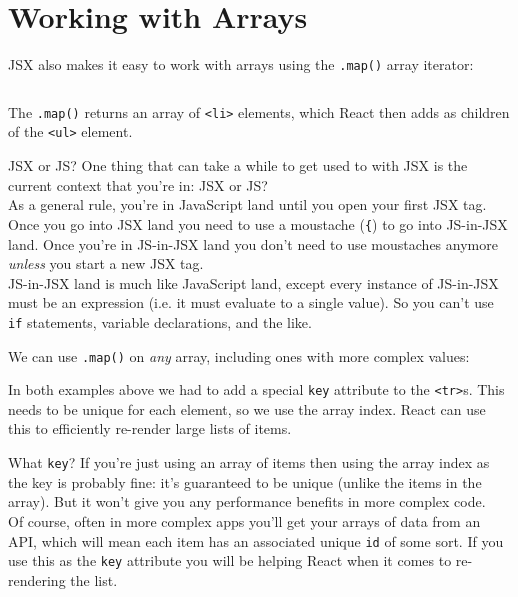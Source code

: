 \section{Working with Arrays}


JSX also makes it easy to work with arrays using the \texttt{.map()} array iterator:

\inputminted{jsx}{01/figures/02/13-map.jsx}

The \texttt{.map()} returns an array of \texttt{<li>} elements, which React then adds as children of the \texttt{<ul>} element.

\begin{infobox}{JSX or JS?}
    One thing that can take a while to get used to with JSX is the current context that you're in: JSX or JS?
    \\

    As a general rule, you're in JavaScript land until you open your first JSX tag. Once you go into JSX land you need to use a moustache (\texttt{\{}) to go into JS-in-JSX land. Once you're in JS-in-JSX land you don't need to use moustaches anymore \textit{unless} you start a new JSX tag.
    \\

    JS-in-JSX land is much like JavaScript land, except every instance of JS-in-JSX must be an expression (i.e. it must evaluate to a single value). So you can't use \texttt{if} statements, variable declarations, and the like.

\end{infobox}


\pagebreak


We can use \texttt{.map()} on \textit{any} array, including ones with more complex values:


In both examples above we had to add a special \texttt{key} attribute to the \texttt{<tr>}s. This needs to be unique for each element, so we use the array index. React can use this to efficiently re-render large lists of items.

\begin{infobox}{What \texttt{key}?}
    If you're just using an array of items then using the array index as the key is probably fine: it's guaranteed to be unique (unlike the items in the array). But it won't give you any performance benefits in more complex code.
    \\

    Of course, often in more complex apps you'll get your arrays of data from an API, which will mean each item has an associated unique \texttt{id} of some sort. If you use this as the \texttt{key} attribute you will be helping React when it comes to re-rendering the list.
\end{infobox}



